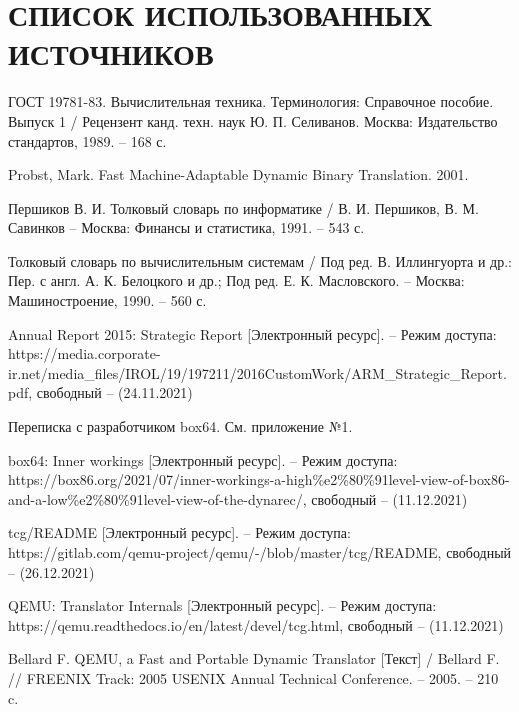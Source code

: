 \section*{СПИСОК ИСПОЛЬЗОВАННЫХ ИСТОЧНИКОВ}

\begingroup
\renewcommand{\section}[2]{}
\begin{thebibliography}{}
	ГОСТ 19781-83. Вычислительная техника. Терминология: Справочное пособие. Выпуск 1 / Рецензент канд. техн. наук Ю. П. Селиванов. Москва: Издательство стандартов, 1989. -- 168 с.
		 
	Probst, Mark. Fast Machine-Adaptable Dynamic Binary Translation. 2001.
		 
	Першиков В. И. Толковый словарь по информатике / В. И. Першиков, В. М. Савинков -- Москва: Финансы и статистика, 1991. -- 543 с.
	
	Толковый словарь по вычислительным системам / Под ред. В. Иллингуорта и др.: Пер. с англ. А. К. Белоцкого и др.; Под ред. Е. К. Масловского. -- Москва: Машиностроение, 1990. -- 560 с.
	
	Annual Report 2015: Strategic Report [Электронный ресурс]. -- Режим доступа: https://media.corporate-ir.net/media\_files/IROL/19/197211/2016CustomWork/ARM\_Strategic\_Report.pdf,
	свободный -- (24.11.2021)
	
	Переписка с разработчиком box64. См. приложение №1.
	
	box64: Inner workings [Электронный ресурс]. -- Режим доступа: https://box86.org/2021/07/inner-workings-a-high\%e2\%80\%91level-view-of-box86-and-a-low\%e2\%80\%91level-view-of-the-dynarec/,
	свободный -- (11.12.2021)
	
	tcg/README  [Электронный ресурс]. -- Режим доступа: https://gitlab.com/qemu-project/qemu/-/blob/master/tcg/README,
	свободный -- (26.12.2021)
	
	QEMU: Translator Internals [Электронный ресурс]. -- Режим доступа: https://qemu.readthedocs.io/en/latest/devel/tcg.html,
	свободный -- (11.12.2021)
	
	Bellard F. QEMU, a Fast and Portable Dynamic Translator [Текст]  / Bellard F. // FREENIX Track: 2005 USENIX Annual Technical Conference. -- 2005. -- 210 c.


\end{thebibliography}

